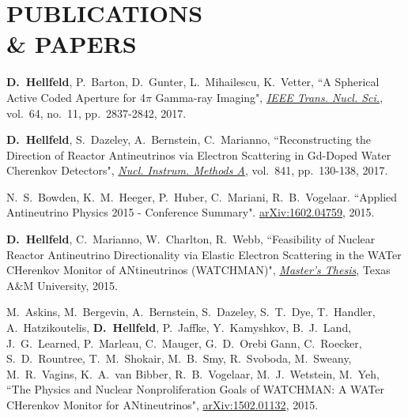 \section{\small{PUBLICATIONS \\\& PAPERS}}

\begin{thebibliography}{3}
 \raggedright
\vspace{10pt}

 \textbf{D.~Hellfeld}, P.~Barton, D.~Gunter, L.~Mihailescu, K.~Vetter, ``A Spherical Active Coded Aperture for 4$\pi$ Gamma-ray Imaging", \href{http://ieeexplore.ieee.org/document/8048531/}{\emph{IEEE Trans. Nucl. Sci.}}, vol.~64, no.~11, pp.~2837-2842, 2017.
 
 \textbf{D.~Hellfeld}, S.~Dazeley, A.~Bernstein, C.~Marianno, ``Reconstructing the Direction of Reactor Antineutrinos via Electron Scattering in Gd-Doped Water Cherenkov Detectors", \href{http://www.sciencedirect.com/science/article/pii/S0168900216310555}{\emph{Nucl. Instrum. Methods A}}, vol.~841, pp.~130-138, 2017.

 N.~S.~Bowden, K.~M.~Heeger, P.~Huber, C.~Mariani, R.~B.~Vogelaar. ``Applied Antineutrino Physics 2015 - Conference Summary". \href{http://arxiv.org/abs/1602.04759}{arXiv:1602.04759}, 2015.

 \textbf{D.~Hellfeld}, C.~Marianno, W.~Charlton, R.~Webb, ``Feasibility of Nuclear Reactor Antineutrino Directionality via Elastic Electron Scattering in the WATer CHerenkov Monitor of ANtineutrinos (WATCHMAN)", \href{http://hdl.handle.net/1969.1/155140}{\emph{Master's Thesis}}, Texas A\&M University, 2015.

 M.~Askins, M.~Bergevin, A.~Bernstein, S.~Dazeley, S.~T.~Dye, T.~Handler, A.~Hatzikoutelis, \textbf{D.~Hellfeld}, P.~Jaffke, Y.~Kamyshkov, B.~J.~Land, J.~G.~Learned, P.~Marleau, C.~Mauger, G.~D.~Orebi Gann, C.~Roecker, S.~D.~Rountree, T.~M.~Shokair, M.~B.~Smy, R.~Svoboda, M.~Sweany, M.~R.~Vagins, K.~A.~van Bibber, R.~B.~Vogelaar, M.~J.~Wetstein, M.~Yeh, ``The Physics and Nuclear Nonproliferation Goals of WATCHMAN: A WATer CHerenkov Monitor for ANtineutrinos", \href{http://arxiv.org/pdf/1502.01132.pdf}{arXiv:1502.01132}, 2015.

\end{thebibliography}